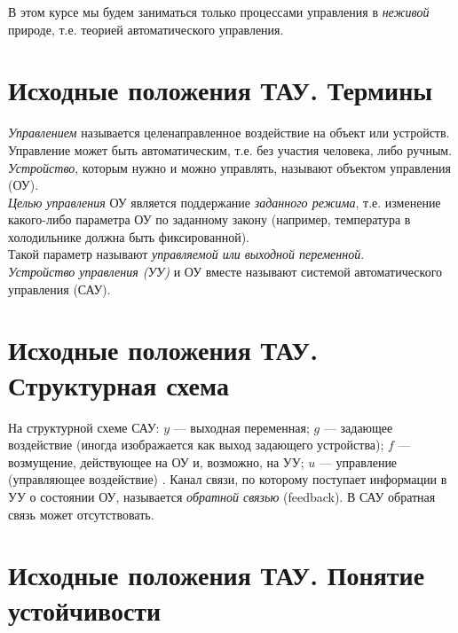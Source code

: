 \documentclass[../TAU.tex]{subfiles}
\theoremstyle{plain}
\theoremstyle{definition}
\theoremstyle{remark}
\theoremstyle{plain}
\begin{document}
В этом курсе мы будем заниматься только процессами управления в {\it неживой} природе, т.е. теорией автоматического управления.




\section{Исходные положения ТАУ. Термины}

{\it Управлением} называется целенаправленное воздействие на объект или устройств. Управление может быть автоматическим, т.е. без участия человека, либо ручным.\\

{\it Устройство}, которым нужно и можно управлять, называют объектом управления (ОУ).\\

{\it Целью управления} ОУ является поддержание {\it заданного режима}, т.е. изменение какого-либо параметра ОУ по заданному закону (например, температура в холодильнике должна быть фиксированной). \\

Такой параметр называют {\it управляемой или выходной переменной}.\\

{\it Устройство управления (УУ)} и ОУ вместе называют системой автоматического управления (САУ).\\




\section{Исходные положения ТАУ. Структурная схема}

\begin{figure}
\end{figure}

На структурной схеме САУ: $y$ --- выходная переменная; $g$ --- задающее воздействие (иногда изображается как выход задающего устройства); $f$ --- возмущение, действующее на ОУ и, возможно, на УУ; $u$ --- управление (управляющее воздействие) . Канал связи, по которому поступает информации в УУ о состоянии ОУ, называется {\it обратной связью} (feedback). В САУ обратная связь может отсутствовать.



\section{Исходные положения ТАУ. Понятие устойчивости}
\end{document}
